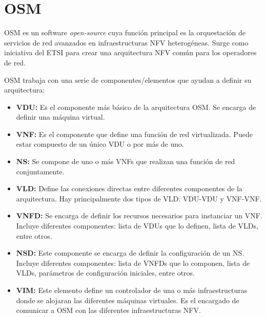 \section{OSM}
\label{sec:osm}

\ac{OSM}\cite{osmbib} es un software \textit{open-source} cuya función principal es la orquestación de servicios de red avanzados en infraestructuras \ac{NFV} heterogéneas. Surge como iniciativa del \ac{ETSI} para crear una arquitectura \ac{NFV} común para los operadores de red.

\ac{OSM} trabaja con una serie de componentes/elementos que ayudan a definir su arquitectura:

\begin{itemize}
	\item \textbf{\ac{VDU}:} Es el componente más básico de la arquitectura \ac{OSM}. Se encarga de definir una máquina virtual. 

	\item \textbf{\ac{VNF}:} Es el componente que define una función de red virtualizada. Puede estar compuesto de un único \ac{VDU} o por más de uno.
	
	\item \textbf{\ac{NS}:} Se compone de uno o más \acp{VNF} que realizan una función de red conjuntamente.
	
	\item \textbf{\ac{VLD}:} Define las conexiones directas entre diferentes componentes de la arquitectura. Hay principalmente dos tipos de \ac{VLD}: \ac{VDU}-\ac{VDU} y \ac{VNF}-\ac{VNF}.
	
	\item \textbf{\ac{VNFD}:} Se encarga de definir los recursos necesarios para instanciar un \ac{VNF}. Incluye diferentes componentes: lista de \acp{VDU} que lo definen, lista de \acp{VLD}, entre otros.
	
	\item \textbf{\ac{NSD}:} Este componente se encarga de definir la configuración de un \ac{NS}. Incluye diferentes componentes: lista de \acp{VNFD} que lo componen, lista de \acp{VLD}, parámetros de configuración iniciales, entre otros.
	
	\item \textbf{\ac{VIM}:} Este elemento define un controlador de una o más infraestructuras donde se alojaran las diferentes máquinas virtuales. Es el encargado de comunicar a \ac{OSM} con las diferentes infraestructuras \ac{NFV}.
\end{itemize}

